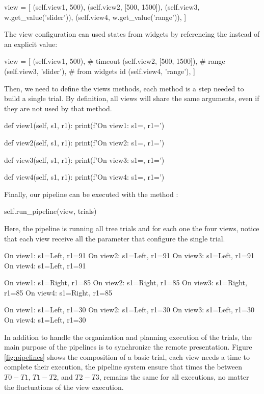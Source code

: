 \begin{python}
view = [
    (self.view1, 500),
    (self.view2, [500, 1500]),
    (self.view3, w.get_value('slider')),
    (self.view4, w.get_value('range')),
]
\end{python}

The view configuration can used states from widgets by referencing the  instead of an explicit value:

\begin{python}
view = [
    (self.view1, 500),          # timeout
    (self.view2, [500, 1500]),  # range
    (self.view3, 'slider'),     # from widgets id
    (self.view4, 'range'),
]
\end{python}

Then, we need to define the views methods, each method  is a step needed to build a single trial. By definition, all views will share the same arguments, even if they are not used by that method.
 
\begin{python}
def view1(self, s1, r1):
    print(f'On view1: {s1=}, {r1=}')

def view2(self, s1, r1):
    print(f'On view2: {s1=}, {r1=}')

def view3(self, s1, r1):
    print(f'On view3: {s1=}, {r1=}')

def view4(self, s1, r1):
    print(f'On view4: {s1=}, {r1=}\n')
\end{python}

Finally, our pipeline can be executed with the method :

\begin{python}
self.run_pipeline(view, trials)
\end{python}

Here, the pipeline is running all tree trials and for each one the four views, notice that each view receive all the parameter that configure the single trial. 

\begin{python}
On view1: s1=Left, r1=91
On view2: s1=Left, r1=91
On view3: s1=Left, r1=91
On view4: s1=Left, r1=91

On view1: s1=Right, r1=85
On view2: s1=Right, r1=85
On view3: s1=Right, r1=85
On view4: s1=Right, r1=85

On view1: s1=Left, r1=30
On view2: s1=Left, r1=30
On view3: s1=Left, r1=30
On view4: s1=Left, r1=30
\end{python}

In addition to handle the organization and planning execution of the trials, the main purpose of the pipelines is to synchronize the remote presentation. Figure \ref{fig:pipelines} shows the composition of a basic trial, each view needs a time to complete their execution, the pipeline system ensure that times the between $T0-T1$, $T1-T2$, and $T2-T3$, remains the same for all executions, no matter the fluctuations of the view execution.

